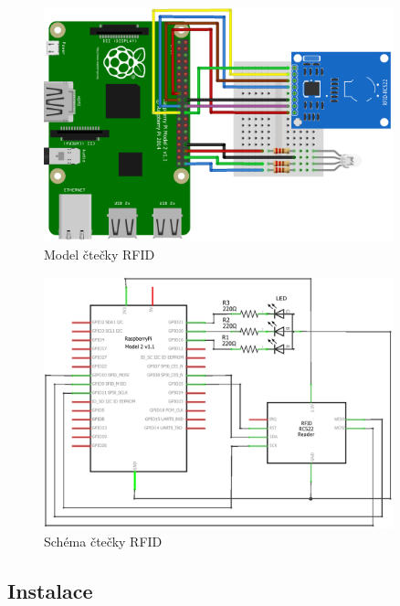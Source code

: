 \documentclass[czech,BP]{thesiskiv}
\begin{document}
\begin{figure}[h]
	\centering
	\includegraphics[width=0.9\textwidth]{../diagrams/reader_rfid_diagram_bb.png}	
	\caption{Model čtečky RFID}
	\label{fig:reader_rfid_diagram_bb}
\end{figure}	
	
\begin{figure}[h]
	\centering
	\includegraphics[width=0.9\textwidth]{../diagrams/reader_rfid_diagram_schem.png}	
	\caption{Schéma čtečky RFID}
	\label{fig:reader_rfid_diagram_schem}
\end{figure}

\subsection{Instalace}
\end{document}
